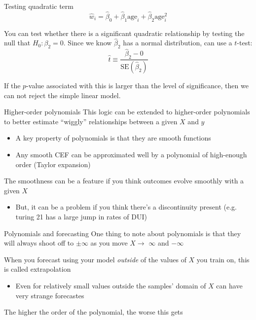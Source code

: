 \documentclass[aspectratio=169,t,11pt,table]{beamer}
\begin{document}
\begin{frame}{Testing quadratic term}
  \vspace{-\bigskipamount}
  $$
    \hat{w}_i = \hat{\beta}_0 + \hat{\beta}_1 \text{age}_i + \hat{\beta}_2 \text{age}_i^2
  $$

  \bigskip
  You can test whether there is a significant quadratic relationship by testing the null that $H_0: \beta_2 = 0$. Since we know $\hat{\beta}_2$ has a normal distribution, can use a $t$-test:
  $$
    \hat{t} \equiv \frac{\hat{\beta}_2 - 0}{\text{SE}(\hat{\beta}_2)}
  $$

  \bigskip
  If the $p$-value associated with this is larger than the level of significance, then we can not reject the simple linear model.
\end{frame}

\begin{frame}{Higher-order polynomials}
  This logic can be extended to higher-order polynomials to better estimate ``wiggly'' relationships between a given $X$ and $y$
  \begin{itemize}
    \item A key property of polynomials is that they are \alert{smooth} functions
    
    \item Any smooth CEF can be approximated well by a polynomial of high-enough order (Taylor expansion) 
  \end{itemize}

  \pause
  \bigskip
  The smoothness can be a feature if you think outcomes evolve smoothly with a given $X$
  \begin{itemize}
    \item But, it can be a problem if you think there's a discontinuity present (e.g. turing 21 has a large jump in rates of DUI)
  \end{itemize}
\end{frame}


\begin{frame}{Polynomials and forecasting}
  One thing to note about polynomials is that they will always shoot off to $\pm \infty$ as you move $X \to$ $\infty$ and $-\infty$

  \bigskip
  When you forecast using your model \emph{outside} of the values of $X$ you train on, this is called \alert{extrapolation}
  \begin{itemize}
    \item Even for relatively small values outside the samples' \alert{domain} of $X$ can have very strange forecastes
  \end{itemize}

  \pause
  \bigskip
  The higher the order of the polynomial, the worse this gets
\end{frame}
\end{document}
